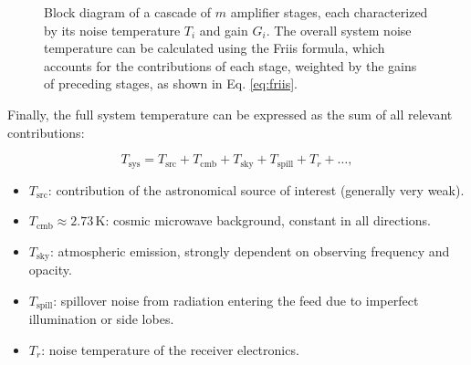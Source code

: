 \begin{figure}[h!]
	\centering
	\caption[Block diagram of a cascade of amplifiers]{Block diagram of a cascade of $m$ amplifier stages, each characterized by its noise temperature $T_i$ and gain $G_i$. The overall system noise temperature can be calculated using the Friis formula, which accounts for the contributions of each stage, weighted by the gains of preceding stages, as shown in Eq. \ref{eq:friis}.}
	\label{fig:friis}
\end{figure}

Finally, the full system temperature can be expressed as the sum of all relevant contributions:  

\begin{equation}
    T_\text{sys} = T_\text{src} + T_\text{cmb} + T_\text{sky} + T_\text{spill} + T_r + \dots,
\end{equation}

\begin{itemize}
	\item $T_\text{src}$: contribution of the astronomical source of interest (generally very weak).
	\item $T_\text{cmb} \approx 2.73 \, \text{K}$: cosmic microwave background, constant in all directions.
	\item $T_\text{sky}$: atmospheric emission, strongly dependent on observing frequency and opacity.
	\item $T_\text{spill}$: spillover noise from radiation entering the feed due to imperfect illumination or side lobes.
	\item $T_r$: noise temperature of the receiver electronics.
\end{itemize} 

